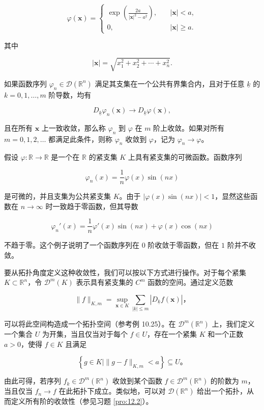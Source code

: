 $$
\varphi(\mathbf{x}) =
\begin{cases}
\exp\left(\frac{2a}{|\mathbf{x}|^2 - a^2}\right), & \quad |\mathbf{x}| < a, \\
0, & \quad |\mathbf{x}| \geq a.
\end{cases}
$$

其中

$$
|\mathbf{x}| = \sqrt{x_1^2 + x_2^2 + \cdots + x_n^2}.
$$

如果函数序列 $\varphi_n \in \mathcal{D}(\mathbb{R}^n)$
满足其支集在一个公共有界集合内，且对于任意 $\underline{k}$ 的
$k=0, 1, \ldots, m$ 阶导数，均有

$$
D_{\underline{k}} \varphi_n(\mathbf{x}) \to D_{\underline{k}} \varphi(\mathbf{x}),
$$

且在所有 $\mathbf{x}$ 上一致收敛，那么称 $\varphi_n$ 到 $\varphi$
在 $m$ 阶上收敛。如果对所有 $m=0,1,2,\ldots$ 都满足此条件，则称
$\varphi_n$ 收敛到 $\varphi$，记为 $\varphi_n \to \varphi$。
\begin{eg}
  假设 $\varphi: \mathbb{R} \to \mathbb{R}$ 是一个在
$\mathbb{R}$ 的紧支集 $K$ 上具有紧支集的可微函数。函数序列

$$
\varphi_n(x) = \frac{1}{n} \varphi(x) \sin(nx)
$$

是可微的，并且支集为公共紧支集 $K$。由于
$|\varphi(x) \sin(nx)| < 1$，显然这些函数在 $n \to \infty$
时一致趋于零函数，但其导数

$$
\varphi_n'(x) = \frac{1}{n} \varphi'(x) \sin(nx) + \varphi(x) \cos(nx)
$$

不趋于零。这个例子说明了一个函数序列在 $0$ 阶收敛于零函数，但在 $1$
阶并不收敛。
\end{eg}

要从拓扑角度定义这种收敛性，我们可以按以下方式进行操作。对于每个紧集
$K \subset \mathbb{R}^n$，令 $\mathcal{D}^m(K)$ 表示具有紧支集的
$C^m$ 函数的空间。通过定义范数

$$
\|f\|_{K, m} = \sup_{\mathbf{x} \in K} \sum_{\mid \underline{k} \mid \leq m}\left|D_{\underline{k}} f(\mathbf{x})\right|，
$$

可以将此空间构造成一个拓扑空间（参考例 10.25）。在
$\mathcal{D}^m(\mathbb{R}^n)$ 上，我们定义一个集合 $U$
为开集，当且仅当对于每个 $f \in U$，存在一个紧集 $K$ 和一个正数
$a > 0$，使得 $f \in K$ 且满足

$$
\left\{g \in K \mid \|g - f\|_{K, m} < a\right\} \subseteq U。
$$

由此可得，若序列 $f_k \in \mathcal{D}^m(\mathbb{R}^n)$ 收敛到某个函数
$f \in \mathcal{D}^m(\mathbb{R}^n)$ 的阶数为 $m$，当且仅当
$f_n \to f$ 在此拓扑下成立。类似地，可以对
$\mathcal{D}(\mathbb{R}^n)$
给出一个拓扑，从而定义所有阶的收敛性（参见习题 \ref{pro:12.2}）。

